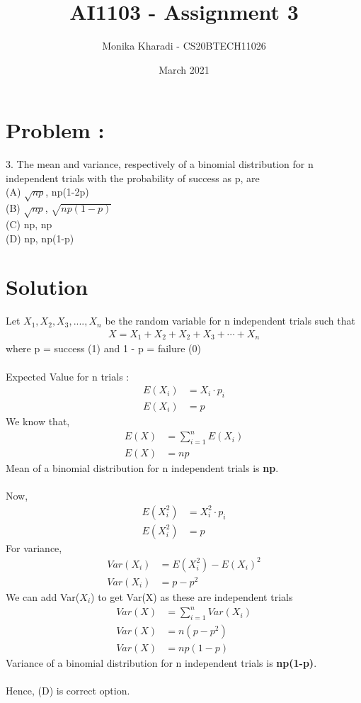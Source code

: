 \documentclass[journal,12pt,two column]{IEEEtran}
\title{AI1103 - Assignment 3}
\author{Monika Kharadi - CS20BTECH11026}
\date{March 2021}
\begin{document}
\maketitle
\section*{\large\textbf{Problem :}}
3. The mean and variance, respectively of a binomial distribution for n independent trials with the probability of success as p, are \\
(A) $\sqrt{np}$, np(1-2p)\\
(B) $\sqrt{np}$, $\sqrt{np(1-p)}$\\
(C) np, np \\
(D) np, np(1-p)
\section*{\large\textbf{Solution}}
Let $X_1,X_2,X_3,....,X_n$ be the random variable for n independent trials such that 
\begin{align}
X=X_1 + X_2 + X_2 + X_3 + \cdots + X_n \nonumber 
\end{align}
where p = success (1) and 1 - p = failure (0) \\ \\
Expected Value for n trials : 
\begin{align}
E(X_i) &= X_i\cdot p_i \nonumber\\
E(X_i) &= p
\end{align}
We know that,
\begin{align}
E(X) &= \sum_{i=1}^n E (X_i) \nonumber\\
E(X) &= np
 \end{align}
Mean of a binomial distribution for n independent trials is \textbf{np}.\\ \\
Now,
\begin{align}
E(X_i^2) &= X_i^2\cdot p_i \nonumber\\
E(X_i^2) &= p
\end{align}
For variance,
\begin{align}
    Var(X_i) &= E(X_i^2) - E(X_i)^2 \\
    Var(X_i) &= p - p^2 
    \end{align}
We can add Var($X_i$)  to get Var(X)  as these are independent trials
\begin{align}
Var(X) &= \sum_{i=1}^n Var(X_i) \nonumber \\
Var(X) &= n(p - p^2)\nonumber\\
Var(X) &= np(1-p)
\end{align}
Variance of a binomial distribution for n independent trials is \textbf{np(1-p)}.\\ \\
Hence, (D) is correct option.
\end{document}
